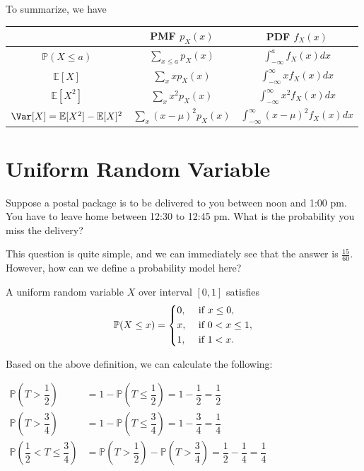 To summarize, we have 
\begin{table}[H]
    \centering
    \begin{tabular}{c c c}
        \toprule
             & PMF \(p_X(x)\)  & PDF \(f_X(x)\)  \\
        \midrule
            \(\mathbb{P}(X \leq a)\)  & \(\sum_{x \leq a} p_X(x)\)  & \(\int_{-\infty}^a f_X(x)dx \)   \\[5pt]
            \(\mathbb{E}[X]\) & \(\sum_{x} xp_X(x)\) & \(\int_{-\infty}^{\infty} xf_X(x)dx \)  \\[5pt]
            \(\mathbb{E}[X^2]\) & \(\sum_{x} x^2p_X(x)\) & \(\int_{-\infty}^{\infty} x^2f_X(x)dx \)  \\[5pt]
            \(\Var[X] = \mathbb{E}[X^2] - \mathbb{E}[X]^2\) & \(\sum_{x} (x - \mu)^2 p_X(x)\)  & \(\int_{-\infty}^{\infty} (x - \mu)^2 f_X(x)dx \)  \\[5pt]
        \bottomrule
    \end{tabular}
\end{table} 

\section{Uniform Random Variable}
Suppose a postal package is to be delivered to you between noon and 1:00 pm. You have to leave home between 12:30 to 12:45 pm. What is the probability you miss the delivery?

This question is quite simple, and we can immediately see that the answer is \(\frac{15}{60}\). However, how can we define a probability model here?

\begin{definition}
    A uniform random variable \(X\) over interval \([0, 1]\) satisfies 
    \[
        \mathbb{P}(X \leq x) = \begin{dcases}
            0, &\text{ if } x \leq 0 ,\\
            x, &\text{ if } 0 < x \leq 1 ,\\
            1, &\text{ if } 1 < x.
        \end{dcases}
    \]
\end{definition}

Based on the above definition, we can calculate the following: 

\(
\begin{aligned}
    \mathbb{P}(T > \dfrac{1}{2}) &= 1 - \mathbb{P}(T \leq \dfrac{1}{2}) = 1 - \dfrac{1}{2} = \dfrac{1}{2} \\
    \mathbb{P}(T > \dfrac{3}{4}) &= 1 - \mathbb{P}(T \leq \dfrac{3}{4}) = 1 - \dfrac{3}{4} = \dfrac{1}{4} \\
    \mathbb{P}(\dfrac{1}{2} < T \leq \dfrac{3}{4}) &= \mathbb{P}(T > \dfrac{1}{2}) - \mathbb{P}(T > \dfrac{3}{4}) = \dfrac{1}{2} - \dfrac{1}{4} = \dfrac{1}{4}
\end{aligned}
\) 

